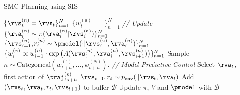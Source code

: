 \begin{algorithm}[H]
\caption{SMC Planning using SIS}
\label{alg:sis_planning}
\begin{algorithmic}[1]
\STATE $\{ \rvs^{(n)}_t = \rvs_t\}_{n=1}^N$
\STATE  $\{w^{(n)}_t =1\}_{n=1}^N$
\STATE \textit{// Update}
\STATE $\{\rva^{(n)}_{i} \sim \pi(\rva^{(n)}_{i}|\rvs^{(n)}_{i})\}_{n=1}^N$
\STATE $\{\rvs^{(n)}_{i+1}, r^{(n)}_{i} \sim \pmodel(\cdot | \rvs^{(n)}_{i}, \rva^{(n)}_{i})\}_{n=1}^N$
\STATE $\{w_i^{(n)} \propto w^{(n)}_{i-1} \cdot \exp \big( A(\rvs^{(n)}_{i}, \rva^{(n)}_{i}, \rvs^{(n)}_{i+1}) \big) \}_{n=1}^N$
\ENDFOR
\STATE Sample $n \sim \text{Categorical}(w_{t+h}^{(1)}, \ldots, w_{t+h}^{(N)})$.
\STATE \textit{// Model Predictive Control}
\STATE Select $\rva_t$, first action of $\traj^{(n)}_{t:t+h}$
\STATE $\rvs_{t+1}, r_t \sim p_{\text{env}}(\cdot|\rvs_t, \rva_t)$
\STATE Add $(\rvs_t, \rva_t, r_t, \rvs_{t+1})$ to buffer $\mathcal{B}$
\STATE Update $\pi$, $V$ and $\pmodel$ with $\mathcal{B}$
\ENDFOR
\end{algorithmic}
\end{algorithm}



